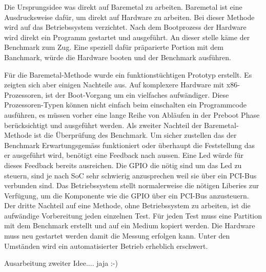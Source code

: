 \par
Die Ursprungsidee was direkt auf Baremetal zu arbeiten. Baremetal ist eine Ausdrucksweise dafür, um direkt auf Hardware zu arbeiten. Bei dieser Methode wird auf das Betriebssystem verzichtet. Nach dem Bootprozess der Hardware wird direkt ein Programm gestartet und ausgeführt. An dieser stelle käme der Benchmark zum Zug. Eine speziell dafür präparierte Portion mit dem Banchmark, würde die Hardware booten und der Benchmark ausführen.
\par
Für die Baremetal-Methode wurde ein funktionstüchtigen Prototyp erstellt. Es zeigten sich aber einigen Nachteile aus. Auf komplexere Hardware mit x86-Prozessoren, ist der Boot-Vorgang um ein vielfaches aufwändiger\cite{intel_boot_process}. Diese Prozessoren-Typen können nicht einfach beim einschalten ein Programmcode ausführen, es müssen vorher eine lange Reihe von Abläufen in der Preboot Phase berücksichtigt und ausgeführt werden. Als zweiter Nachteil der Baremetal-Methode ist die Überprüfung des Benchmark. Um sicher zustellen das der Benchmark Erwartungsgemäss funktioniert oder überhaupt die Feststellung das er ausgeführt wird, benötigt eine Feedback nach aussen. Eine Led würde für dieses Feedback bereits ausreichen. Die GPIO die nötig sind um das Led zu steuern, sind je nach SoC sehr schwierig anzusprechen weil sie über ein PCI-Bus verbunden sind. Das Betriebssystem stellt normalerweise die nötigen Liberies zur Verfügung, um die Komponente wie die GPIO über ein PCI-Bus anzusteuern. Der dritte Nachteil auf eine Methode, ohne Betriebssystem zu arbeiten, ist die aufwändige Vorbereitung jeden einzelnen Test. Für jeden Test muss eine Partition mit dem Benchmark erstellt und auf ein Medium kopiert werden. Die Hardware muss neu gestartet werden
damit die Messung erfolgen kann. Unter den Umständen wird ein automatisierter Betrieb erheblich erschwert.
\par
Ausarbeitung zweiter Idee.... jaja :-)



 